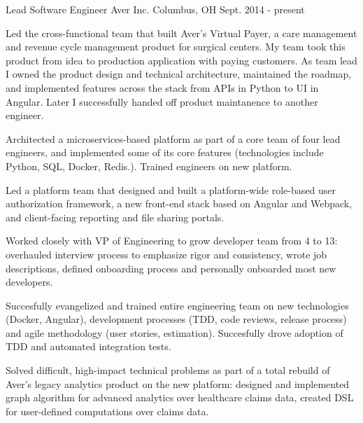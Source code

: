 

\begin{cventries}

  \cventry
    {Lead Software Engineer} %
    {Aver Inc.} %
    {Columbus, OH} %
    {Sept. 2014 - present} %
    {
      \begin{cvitems} %
        \item {Led the cross-functional team that built Aver's Virtual Payer, a care management and revenue cycle management product for surgical centers.
        My team took this product from idea to production application with paying customers.
        As team lead I owned the product design and technical architecture, maintained the roadmap, and implemented features across the stack from APIs in Python to UI in Angular.
        Later I successfully handed off product maintanence to another engineer.}
        \item {Architected a microservices-based platform as part of a core team of four lead engineers, and implemented some of its core features (technologies include Python, SQL, Docker, Redis.).
        Trained engineers on new platform.}
        \item {Led a platform team that designed and built a platform-wide role-based user authorization framework, a new front-end stack based on Angular and Webpack, and client-facing reporting and file sharing portals.}
        \item {Worked closely with VP of Engineering to grow developer team from 4 to 13: overhauled interview process to emphasize rigor and consistency, wrote job descriptions, defined onboarding process and personally onboarded most new developers.}
        \item {Succesfully evangelized and trained entire engineering team on new technologies (Docker, Angular), development processes (TDD, code reviews, release process) and agile methodology (user stories, estimation).
        Succesfully drove adoption of TDD and automated integration tests.}
        \item {Solved difficult, high-impact technical problems as part of a total rebuild of Aver's legacy analytics product on the new platform: designed and implemented graph algorithm for advanced analytics over healthcare claims data, created DSL for user-defined computations over claims data.}
      \end{cvitems}
    }


\end{cventries}
